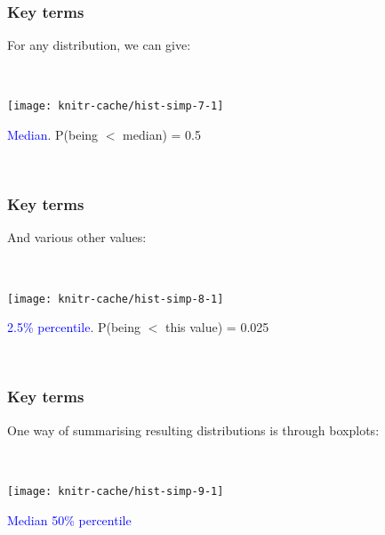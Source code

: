 
\begin{frame}
\frametitle{Key terms}

For any distribution, we can give:

~\\

\begin{knitrout}
\color{fgcolor}
\texttt{[image: knitr-cache/hist-simp-7-1]}

\end{knitrout}

\textcolor{blue}{Median}. P(being $<$ median) = 0.5

~\\

\end{frame}



\begin{frame}
\frametitle{Key terms}

And various other values:

~\\

\begin{knitrout}
\color{fgcolor}
\texttt{[image: knitr-cache/hist-simp-8-1]}

\end{knitrout}

\textcolor{blue}{2.5\% percentile}. P(being $<$ this value) = 0.025

~\\

\end{frame}


\begin{frame}
\frametitle{Key terms}

One way of summarising resulting distributions is through boxplots:

~\\

\begin{knitrout}
\color{fgcolor}
\texttt{[image: knitr-cache/hist-simp-9-1]}

\end{knitrout}
\textcolor{blue}{Median 50\% percentile}  %

~\\

\end{frame}

